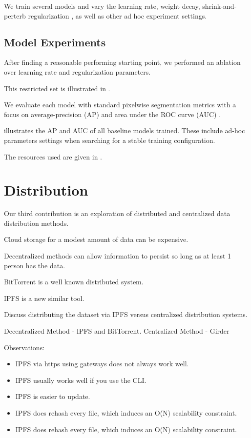 \documentclass[10pt,twocolumn,letterpaper]{article}
\begin{document}
We train several models and vary the learning rate, weight decay,
shrink-and-perterb regularization \cite{ash_warm_starting_2020}, as well as
other ad hoc experiment settings.

\subsection{Model Experiments}

After finding a reasonable performing starting point, we performed an ablation
over learning rate and regularization parameters. 

This restricted set is illustrated in .

We evaluate each model with standard pixelwise segmentation metrics with a
focus on average-precision (AP) and  area under the ROC curve (AUC)
\cite{metrics} .

 illustrates the AP and AUC of all baseline models trained.
These include ad-hoc parameters settings when searching for a stable training
configuration.

The resources used are given in .

\section{Distribution}


Our third contribution is an exploration of distributed and centralized data distribution methods. 

Cloud storage for a modest amount of data can be expensive.

Decentralized methods can allow information to persist so long as at least 1
person has the data.

BitTorrent is a well known distributed system.

IPFS is a new similar tool.


Discuss distributing the dataset via IPFS versus centralized distribution
systems.

Decentralized Method - IPFS and BitTorrent.
Centralized Method - Girder

Observations:
\begin{itemize}
    \item IPFS via https using gateways does not always work well.
    \item IPFS usually works well if you use the CLI.
    \item IPFS is easier to update.
    \item IPFS does rehash every file, which induces an O(N) scalability constraint.
    \item IPFS does rehash every file, which induces an O(N) scalability constraint.
\end{itemize}
\end{document}
